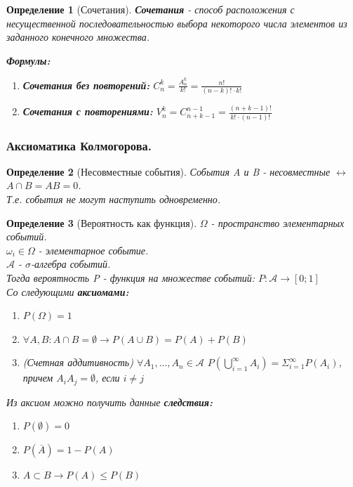\documentclass[14pt]{extarticle}
\theoremstyle{breakstyle}
\newtheorem{definition}{Определение}[subsection]
\begin{document}
\begin{definition}[Сочетания]
\textbf{Сочетания} - способ расположения с несущественной последовательностью выбора некоторого числа элементов из заданного конечного множества.

\vspace{\baselineskip}

\textbf{Формулы:}
\begin{enumerate}
    \item \textbf{Сочетания без повторений:} $C_{n}^{k} = \frac{A_{n}^{k}}{k!} = \frac{n!}{(n - k)! \cdot k!}$
    \item \textbf{Сочетания с повторениями:} $V_{n}^{k} = C_{n+k-1}^{n-1} = \frac{(n+k-1)!}{k! \cdot (n-1)!}$
\end{enumerate} 

\end{definition}

\subsubsection{Аксиоматика Колмогорова.}
\begin{definition}[Несовместные события]

События A и B - несовместные $\leftrightarrow$ $A \cap B = AB = 0$. \\
Т.е. события не могут наступить одновременно.

\end{definition}

\begin{definition}[Вероятность как функция]
$\Omega$ - пространство элементарных событий. \\
$\omega_i \in \Omega$ - элементарное событие. \\
$\mathscr{A}$ - $\sigma$-алгебра событий. \\

Тогда вероятность P - функция на множестве событий:
$P: \mathscr{A} \rightarrow [0; 1]$ \\

Со следующими \textbf{аксиомами:}
\begin{enumerate}
    \item $P(\Omega) = 1$
    \item $\forall A, B: A \cap B = \emptyset \rightarrow P(A \cup B) = P(A) + P(B)$
    \item (Счетная аддитивность) $\forall A_1, ... , A_n \in \mathscr{A}$ $P(\bigcup_{i=1}^{\infty} A_i) = \Sigma_{i=1}^{\infty}P(A_i)$, причем $A_{i}A_{j} = \emptyset$, если $i \neq j$
\end{enumerate}

\vspace{\baselineskip}

Из аксиом можно получить данные \textbf{следствия:}
\begin{enumerate}
    \item $P(\emptyset) = 0$
    \item $P(\overline{A}) = 1 - P(A)$
    \item $A \subset B \rightarrow P(A) \leq P(B)$
\end{enumerate}

\end{definition}
\end{document}

